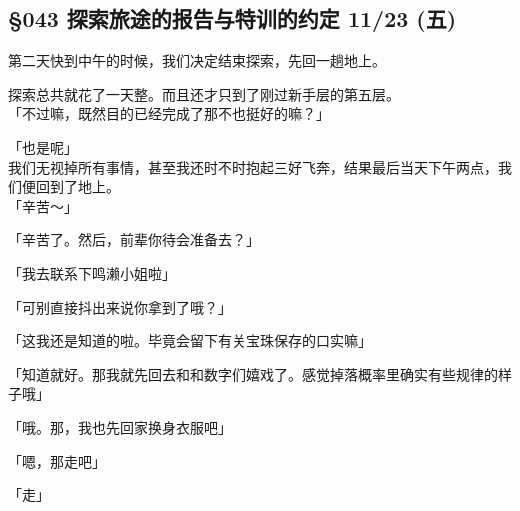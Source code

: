 \subsection{§043 探索旅途的报告与特训的约定 11/23 (五)}

第二天快到中午的时候，我们决定结束探索，先回一趟地上。

探索总共就花了一天整。而且还才只到了刚过新手层的第五层。\\

「不过嘛，既然目的已经完成了那不也挺好的嘛？」

「也是呢」\\

我们无视掉所有事情，甚至我还时不时抱起三好飞奔，结果最后当天下午两点，我们便回到了地上。\\

「辛苦～」

「辛苦了。然后，前辈你待会准备去？」

「我去联系下鸣濑小姐啦」

「可别直接抖出来说你拿到了哦？」

「这我还是知道的啦。毕竟会留下有关宝珠保存的口实嘛」

「知道就好。那我就先回去和和数字们嬉戏了。感觉掉落概率里确实有些规律的样子哦」

「哦。那，我也先回家换身衣服吧」

「嗯，那走吧」

「走」\\

